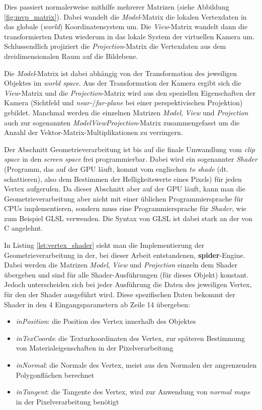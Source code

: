 \documentclass[oneside]{ausarbeitung}
\begin{document}
Dies passiert normalerweise mithilfe mehrerer Matrizen (siehe Abbildung \ref{fig:mvp_matrix}). Dabei wandelt die \textit{Model}-Matrix die lokalen Vertexdaten in das globale (\textit{world}) Koordinatensystem um. Die \textit{View}-Matrix wandelt dann die transformierten Daten wiederum in das lokale System der virtuellen Kamera um. Schlussendlich projiziert die \textit{Projection}-Matrix die Vertexdaten aus dem dreidimensionalen Raum auf die Bildebene. 

Die \textit{Model}-Matrix ist dabei abhängig von der Transformation des jeweiligen Objektes im \textit{world space}. Aus der Transformation der Kamera ergibt sich die \textit{View}-Matrix und die \textit{Projection}-Matrix wird aus den speziellen Eigenschaften der Kamera (Sichtfeld und \textit{near-}/\textit{far-plane} bei einer perspektivischen Projektion) gebildet. Manchmal werden die einzelnen Matrizen \textit{Model}, \textit{View} und \textit{Projection} auch zur sogenannten \textit{ModelViewProjection}-Matrix zusammengefasst um die Anzahl der Vektor-Matrix-Multiplikationen zu verringern.

Der Abschnitt Geometrieverarbeitung ist bis auf die finale Umwandlung vom \textit{clip space} in den \textit{screen space} frei programmierbar. Dabei wird ein sogenannter \textit{Shader} (Programm, das auf der \ac{GPU} läuft, kommt vom englischen \textit{to shade} (dt. schattieren), also dem Bestimmen der Helligkeitswerte eines Pixels) für jeden Vertex aufgerufen. Da dieser Abschnitt aber auf der \ac{GPU} läuft, kann man die Geometrieverarbeitung aber nicht mit einer üblichen Programmiersprache für \ac{CPU}s implementieren, sondern muss eine Programmiersprache für \textit{Shader}, wie zum Beispiel GLSL verwenden. Die Syntax von \ac{GLSL} ist dabei stark an der von C angelehnt. 

In Listing \ref{lst:vertex_shader} sieht man die Implementierung der Geometrieverarbeitung in der, bei dieser Arbeit entstandenen, \textbf{spider}-Engine. Dabei werden die Matrizen \textit{Model}, \textit{View} und \textit{Projection} einzeln dem Shader übergeben und sind für alle Shader-Ausführungen (für dieses Objekt) konstant. Jedoch unterscheiden sich bei jeder Ausführung die Daten des jeweiligen Vertex, für den der Shader ausgeführt wird. Diese spezifischen Daten bekommt der Shader in den 4 Eingangsparametern ab Zeile 14 übergeben:
\begin{itemize}
\item{\textit{inPosition}: die Position des Vertex innerhalb des Objektes}
\item{\textit{inTexCoords}: die Texturkoordinaten des Vertex, zur späteren Bestimmung von Materialeigenschaften in der Pixelverarbeitung}
\item{\textit{inNormal}: die Normale des Vertex, meist aus den Normalen der angrenzenden Polygonflächen berechnet}
\item{\textit{inTangent}: die Tangente des Vertex, wird zur Anwendung von \textit{normal maps} in der Pixelverarbeitung benötigt}
\end{itemize}
\end{document}
